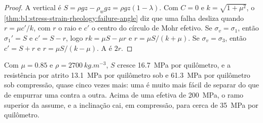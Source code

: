\begin{proof}
A  vertical é $S = \rho g z - \rho_w g z = \rho g z(1-\lambda)$.
Com $C = 0$ e $k = \sqrt{1+\mu^2}$, o \cref{thm:b1:stress-strain-rheology:failure-angle}
diz que uma falha desliza quando $r = \mu c'/k$, com $r$ o raio e $c'$ o
centro do círculo de Mohr efetivo. Se $\sigma_v = \sigma_1$, então
$\sigma_1' = S$ e $c' = S - r$, logo $rk = \mu S - \mu r$ e
$r = \mu S/(k+\mu)$. Se $\sigma_v = \sigma_3$, então $c' = S + r$ e
$r = \mu S/(k-\mu)$. A  é $2r$.
\end{proof}

Com $\mu = 0.85$ e $\rho = \qty{2700}{kg.m^{-3}}$, $S$ cresce
\qty{16.7}{MPa} por quilômetro, e a resistência por atrito \qty{13.1}{MPa} por quilômetro sob  e \qty{61.3}{MPa} por
quilômetro sob compressão, quase cinco vezes mais: uma  é muito mais fácil de separar do que de empurrar uma contra a outra. Acima de uma  efetiva de
\qty{200}{MPa}, o ramo superior da  assume, e a inclinação cai, em compressão, para cerca de \qty{35}{MPa} por quilômetro.

